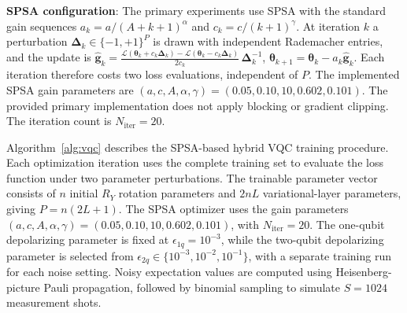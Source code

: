 \documentclass[final,5p,times,number]{elsarticle}
\begin{document}
\textbf{SPSA configuration}: The primary experiments use SPSA with the standard gain sequences $a_k=a/(A+k+1)^{\alpha}$ and $c_k=c/(k+1)^{\gamma}$. At iteration $k$ a perturbation $\boldsymbol{\Delta}_k\in\{-1,+1\}^P$ is drawn with independent Rademacher entries, and the update is $\hat{\mathbf g}_k=\frac{\mathcal{L}(\boldsymbol\theta_k+c_k\boldsymbol\Delta_k)-\mathcal{L}(\boldsymbol\theta_k-c_k\boldsymbol\Delta_k)}{2c_k}\,\boldsymbol\Delta_k^{-1}$, $\boldsymbol\theta_{k+1}=\boldsymbol\theta_k-a_k\hat{\mathbf g}_k$. Each iteration therefore costs two loss evaluations, independent of $P$. The implemented SPSA gain parameters are $(a,c,A,\alpha,\gamma) = (0.05,0.10,10,0.602,0.101)$. The provided primary implementation does not apply blocking or gradient clipping. The iteration count is $N_{\text{iter}}=20$.





Algorithm~\ref{alg:vqc} describes the SPSA-based hybrid VQC
training procedure. Each optimization iteration uses the
complete training set to evaluate the loss function under
two parameter perturbations. The trainable parameter vector
consists of $n$ initial $R_Y$ rotation parameters and $2nL$
variational-layer parameters, giving $P=n(2L+1)$.
The SPSA optimizer uses the gain parameters
$(a,c,A,\alpha,\gamma)=(0.05,0.10,10,0.602,0.101)$,
with $N_{\mathrm{iter}}=20$.
The one-qubit depolarizing parameter is fixed at
$\epsilon_{1q}=10^{-3}$, while the two-qubit depolarizing
parameter is selected from
$\epsilon_{2q}\in\{10^{-3},10^{-2},10^{-1}\}$,
with a separate training run for each noise setting.
Noisy expectation values are computed using
Heisenberg-picture Pauli propagation, followed by
binomial sampling to simulate $S=1024$ measurement shots.
\end{document}
